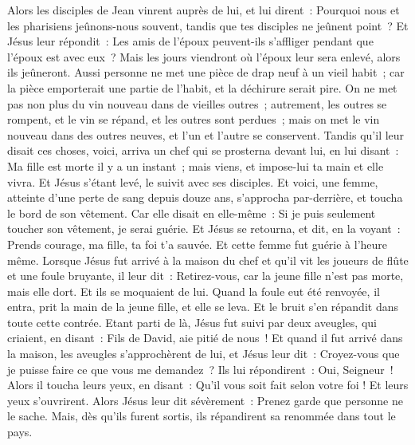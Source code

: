 \begin{multicols}{2}
Alors les disciples de Jean vinrent auprès de lui, et lui dirent~: Pourquoi nous et les pharisiens jeûnons-nous souvent, tandis que tes disciples ne jeûnent point~?
Et Jésus leur répondit~: Les amis de l'époux peuvent-ils s'affliger pendant que l'époux est avec eux~? Mais les jours viendront où l'époux leur sera enlevé, alors ils jeûneront.
Aussi personne ne met une pièce de drap neuf à un vieil habit~; car la pièce emporterait une partie de l'habit, et la déchirure serait pire.
On ne met pas non plus du vin nouveau dans de vieilles outres~; autrement, les outres se rompent, et le vin se répand, et les outres sont perdues~; mais on met le vin nouveau dans des outres neuves, et l'un et l'autre se conservent.
Tandis qu'il leur disait ces choses, voici, arriva un chef qui se prosterna devant lui, en lui disant~: Ma fille est morte il y a un instant~; mais viens, et impose-lui ta main et elle vivra.
Et Jésus s'étant levé, le suivit avec ses disciples.
Et voici, une femme, atteinte d'une perte de sang depuis douze ans, s'approcha par-derrière, et toucha le bord de son vêtement.
Car elle disait en elle-même~: Si je puis seulement toucher son vêtement, je serai guérie.
Et Jésus se retourna, et dit, en la voyant~: Prends courage, ma fille, ta foi t'a sauvée. Et cette femme fut guérie à l'heure même.
Lorsque Jésus fut arrivé à la maison du chef et qu'il vit les joueurs de flûte et une foule bruyante,
il leur dit~: Retirez-vous, car la jeune fille n'est pas morte, mais elle dort. Et ils se moquaient de lui.
Quand la foule eut été renvoyée, il entra, prit la main de la jeune fille, et elle se leva.
Et le bruit s'en répandit dans toute cette contrée.
Etant parti de là, Jésus fut suivi par deux aveugles, qui criaient, en disant~: Fils de David, aie pitié de nous~!
Et quand il fut arrivé dans la maison, les aveugles s'approchèrent de lui, et Jésus leur dit~: Croyez-vous que je puisse faire ce que vous me demandez~? Ils lui répondirent~: Oui, Seigneur~!
Alors il toucha leurs yeux, en disant~: Qu'il vous soit fait selon votre foi !
Et leurs yeux s'ouvrirent. Alors Jésus leur dit sévèrement~: Prenez garde que personne ne le sache.
Mais, dès qu'ils furent sortis, ils répandirent sa renommée dans tout le pays.

\end{multicols}
